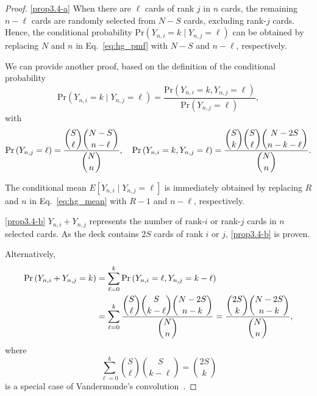 \documentclass[pre, amsmath, floatfix]{revtex4-2}
\theoremstyle{plain}
\theoremstyle{definition}
\theoremstyle{remark}
\newcommand{\Prob}[1]{\mathrm{Pr}\left(#1\right)} %
\newcommand{\E}[1]{E\left[#1\right]} %
\begin{document}
\begin{proof}
\ref{prop3.4-a}
When there are $\ell$ cards of rank $j$ in $n$ cards, the remaining $n-\ell$ cards are randomly selected from $N-S$ cards, excluding rank-$j$ cards.
Hence, the conditional probability $\Prob{Y_{n,i}=k\mid Y_{n,j}=\ell}$ can be obtained by replacing $N$ and $n$ in Eq.~\eqref{eq:hg_pmf} with $N-S$ and $n-\ell$, respectively.

We can provide another proof, based on the definition of the conditional probability
\[
\Prob{Y_{n,i}=k\mid Y_{n,j}=\ell}=\frac{\Prob{Y_{n,i}=k, Y_{n,j}=\ell}}{\Prob{Y_{n,j}=\ell}},
\]
with
\[
\Prob{Y_{n,j}=\ell}=\frac{\dbinom{S}{\ell}\dbinom{N-S}{n-\ell}}{\dbinom{N}{n}},\quad
\Prob{Y_{n,i}=k, Y_{n,j}=\ell}=\frac{\dbinom{S}{k}\dbinom{S}{\ell}\dbinom{N-2S}{n-k-\ell}}{\dbinom{N}{n}}.
\]

The conditional mean $\E{Y_{n,i}\mid Y_{n,j}=\ell}$ is immediately obtained by replacing $R$ and $n$ in Eq.~\eqref{eq:hg_mean} with $R-1$ and $n-\ell$, respectively.

\ref{prop3.4-b}
$Y_{n,i}+Y_{n,j}$ represents the number of rank-$i$ or rank-$j$ cards in $n$ selected cards.
As the deck contains $2S$ cards of rank $i$ or $j$, \ref{prop3.4-b} is proven.

Alternatively,
\begin{align*}
\Prob{Y_{n,i}+Y_{n,j}=k}&=\sum_{\ell=0}^k \Prob{Y_{n,i}=\ell, Y_{n,j}=k-\ell}\\
&=\sum_{\ell=0}^k \frac{\dbinom{S}{\ell}\dbinom{S}{k-\ell}\dbinom{N-2S}{n-k}}{\dbinom{N}{n}}
=\frac{\dbinom{2S}{k}\dbinom{N-2S}{n-k}}{\dbinom{N}{n}},
\end{align*}
where
\[
\sum_{\ell=0}^k \binom{S}{\ell}\binom{S}{k-\ell}=\binom{2S}{k}
\]
is a special case of Vandermonde's convolution~\cite{Riordan}.
\end{proof}
\end{document}
